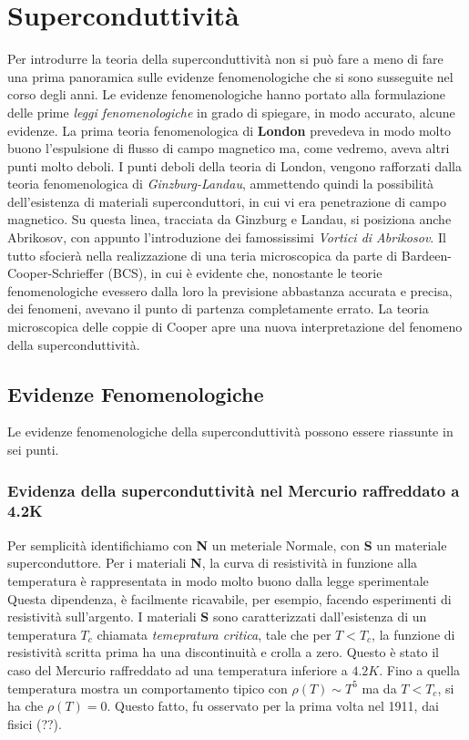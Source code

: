 \section{Superconduttivit\`a}
Per introdurre la teoria della superconduttivit\`a non si pu\`o fare a meno di fare una prima panoramica sulle evidenze fenomenologiche che si sono susseguite nel corso degli anni. Le evidenze fenomenologiche hanno portato alla formulazione delle prime \textit{leggi fenomenologiche} in grado di spiegare, in modo accurato, alcune evidenze. La prima teoria fenomenologica di \textbf{London} prevedeva in modo molto buono l'espulsione di flusso di campo magnetico ma, come vedremo, aveva altri punti molto deboli. I punti deboli della teoria di London, vengono rafforzati dalla teoria fenomenologica di \textit{Ginzburg-Landau}, ammettendo quindi la possibilit\`a dell'esistenza di materiali superconduttori, in cui vi era penetrazione di campo magnetico. Su questa linea, tracciata da Ginzburg e Landau, si posiziona anche Abrikosov, con appunto l'introduzione dei famossissimi \textit{Vortici di Abrikosov}. Il tutto sfocier\`a nella realizzazione di una teria microscopica da parte di Bardeen-Cooper-Schrieffer (BCS), in cui \`e evidente che, nonostante le teorie fenomenologiche evessero dalla loro la previsione abbastanza accurata e precisa, dei fenomeni, avevano il punto di partenza completamente errato. La teoria microscopica delle coppie di Cooper apre una nuova interpretazione del fenomeno della superconduttivit\`a. 
\subsection{Evidenze Fenomenologiche}
Le evidenze fenomenologiche della superconduttivit\`a possono essere riassunte in sei punti.
\subsubsection{Evidenza della superconduttivit\`a nel Mercurio raffreddato a 4.2K}
Per semplicit\`a identifichiamo con \textbf{N} un meteriale Normale, con \textbf{S} un materiale superconduttore. Per i materiali \textbf{N}, la curva di resistivit\`a in funzione alla temperatura \`e rappresentata in modo molto buono dalla legge sperimentale
Questa dipendenza, \`e facilmente ricavabile, per esempio, facendo esperimenti di resistivit\`a sull'argento. I materiali \textbf{S} sono caratterizzati dall'esistenza di un temperatura $T_c$ chiamata \textit{temepratura critica}, tale che per $T<T_c$, la funzione di resistivit\`a scritta prima ha una discontinuit\`a e crolla a zero. Questo \`e stato il caso del Mercurio raffreddato ad una temperatura inferiore a $4.2K$. Fino a quella temperatura mostra un comportamento tipico con $\rho(T)\sim T^5$ ma da $T<T_c$, si ha che $\rho(T)=0$. Questo fatto, fu osservato per la prima volta nel 1911, dai fisici (??).

